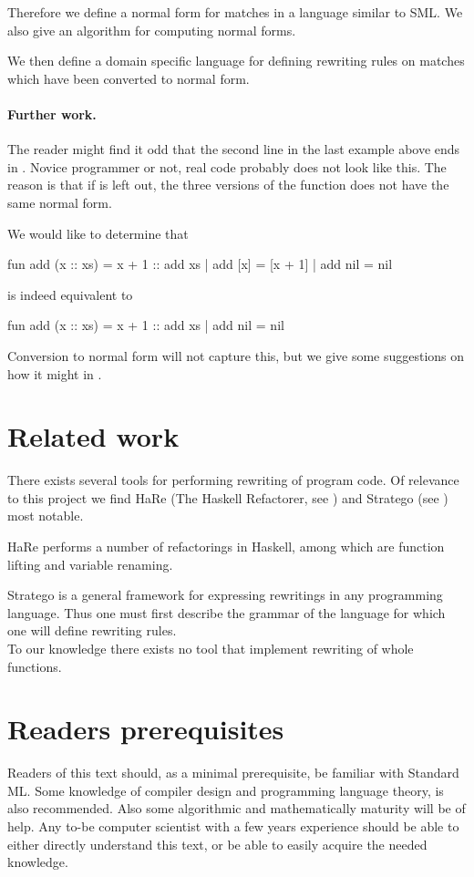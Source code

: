 Therefore we define a normal form for matches in a language similar to SML. We
also give an algorithm for computing normal forms.

We then define a domain specific language for defining rewriting rules on
matches which have been converted to normal form.

\paragraph{Further work.}
The reader might find it odd that the second line in the last example above ends
in . Novice programmer or not, real code probably does not
look like this. The reason is that if  is left out, the three
versions of the function  does not have the same normal form.

We would like to determine that
\begin{sml}
fun add (x :: xs) = x + 1 :: add xs
  | add [x]       = [x + 1]
  | add nil       = nil
\end{sml}
is indeed equivalent to
\begin{sml}
fun add (x :: xs) = x + 1 :: add xs
  | add nil       = nil
\end{sml}
Conversion to normal form will not capture this, but we give some suggestions on
how it might in .

\section{Related work}
There exists several tools for performing rewriting of program code. Of
relevance to this project we find HaRe (The Haskell Refactorer, see \cite{HARE})
and Stratego (see \cite{stratego}) most notable.

HaRe performs a number of refactorings in Haskell, among which are function
lifting and variable renaming.

Stratego is a general framework for expressing rewritings in any programming
language. Thus one must first describe the grammar of the language for which one
will define rewriting rules.\\

To our knowledge there exists no tool that implement rewriting of whole
functions.

\section{Readers prerequisites}
Readers of this text should, as a minimal prerequisite, be familiar with
Standard ML. Some knowledge of compiler design and programming language theory,
is also recommended. Also some algorithmic and mathematically maturity will be
of help. Any to-be computer scientist with a few years experience should be able
to either directly understand this text, or be able to easily acquire the needed
knowledge.\\

